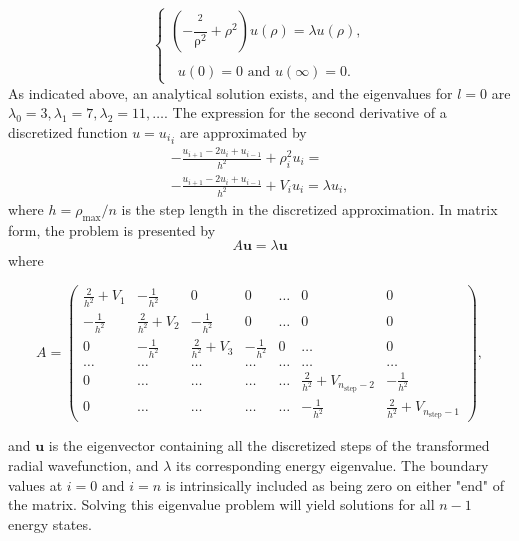\documentclass[a4paper,twocolumn,nofootinbib]{revtex4-1}
\begin{document}
\[
\begin{cases}  \left( -\dfrac{\mathrm{^2}}{\mathrm{\rho^2}}  
       + \rho^2\right ) u(\rho)  = \lambda u(\rho) ,\\
       \\
       \;\; u(0)=0 \text{ and } u(\infty)=0. \end{cases}
\]
As indicated above, an analytical solution exists, and the eigenvalues for $l=0$ are 
$\lambda_0=3,\lambda_1=7,\lambda_2=11,\dots .$
The expression for the second derivative of a discretized function $u={u_i}_i$ are approximated by
\begin{multline*}
-\frac{u_{i+1} -2u_i +u_{i-1}}{h^2}+\rho_i^2u_i=\\
-\frac{u_{i+1} -2u_i +u_{i-1} }{h^2}+V_iu_i  = \lambda u_i,
\end{multline*}
where $h = \rho_\text{max}/n$ is the step length in the discretized approximation. In matrix form, the problem is presented by
\begin{equation}\label{eigvalprob}
A\boldsymbol{u} = \lambda \boldsymbol{u}
\end{equation}
 where
\begin{widetext}
\begin{equation}
   A= \left( \begin{array}{ccccccc} \frac{2}{h^2}+V_1 & -\frac{1}{h^2} & 0   & 0    & \dots  &0     & 0 \\
                                -\frac{1}{h^2} & \frac{2}{h^2}+V_2 & -\frac{1}{h^2} & 0    & \dots  &0     &0 \\
                                0   & -\frac{1}{h^2} & \frac{2}{h^2}+V_3 & -\frac{1}{h^2}  &0       &\dots & 0\\
                                \dots  & \dots & \dots & \dots  &\dots      &\dots & \dots\\
                                0   & \dots & \dots & \dots  &\dots       &\frac{2}{h^2}+V_{n_{\mathrm{step}}-2} & -\frac{1}{h^2}\\
                                0   & \dots & \dots & \dots  &\dots       &-\frac{1}{h^2} & \frac{2}{h^2}+V_{n_{\mathrm{step}}-1}

             \end{array} \right),
\label{eq:matrixse} 
\end{equation}
\end{widetext}
and $\boldsymbol{u}$ is the eigenvector containing all the discretized steps of the transformed radial wavefunction, and $\lambda$ its corresponding energy eigenvalue. The boundary values at $i=0$ and $i=n$ is intrinsically included as being zero on either "end" of the matrix. Solving this eigenvalue problem will yield solutions for all $n-1$ energy states.
\end{document}
